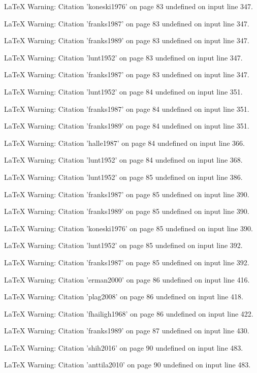 LaTeX Warning: Citation 'koneski1976' on page 83 undefined on input line 347.


LaTeX Warning: Citation 'franks1987' on page 83 undefined on input line 347.


LaTeX Warning: Citation 'franks1989' on page 83 undefined on input line 347.


LaTeX Warning: Citation 'lunt1952' on page 83 undefined on input line 347.


LaTeX Warning: Citation 'franks1987' on page 83 undefined on input line 347.


LaTeX Warning: Citation 'lunt1952' on page 84 undefined on input line 351.


LaTeX Warning: Citation 'franks1987' on page 84 undefined on input line 351.


LaTeX Warning: Citation 'franks1989' on page 84 undefined on input line 351.


LaTeX Warning: Citation 'halle1987' on page 84 undefined on input line 366.


LaTeX Warning: Citation 'lunt1952' on page 84 undefined on input line 368.


LaTeX Warning: Citation 'lunt1952' on page 85 undefined on input line 386.


LaTeX Warning: Citation 'franks1987' on page 85 undefined on input line 390.


LaTeX Warning: Citation 'franks1989' on page 85 undefined on input line 390.


LaTeX Warning: Citation 'koneski1976' on page 85 undefined on input line 390.


LaTeX Warning: Citation 'lunt1952' on page 85 undefined on input line 392.


LaTeX Warning: Citation 'franks1987' on page 85 undefined on input line 392.


LaTeX Warning: Citation 'erman2000' on page 86 undefined on input line 416.


LaTeX Warning: Citation 'plag2008' on page 86 undefined on input line 418.


LaTeX Warning: Citation 'fhailigh1968' on page 86 undefined on input line 422.


LaTeX Warning: Citation 'franks1989' on page 87 undefined on input line 430.


LaTeX Warning: Citation 'shih2016' on page 90 undefined on input line 483.


LaTeX Warning: Citation 'anttila2010' on page 90 undefined on input line 483.


